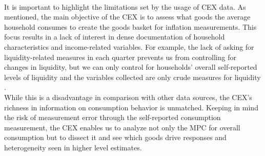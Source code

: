 \\ It is important to highlight the limitations set by the usage of CEX data. As mentioned, the main objective of the CEX is to assess what goods the average household consumes to create the goods basket for inflation measurements. This focus results in a lack of interest in dense documentation of household characteristics and income-related variables. For example, the lack of asking for liquidity-related measures in each quarter prevents us from controlling for changes in liquidity, but we can only control for households' overall self-reported levels of liquidity and the variables collected are only crude measures for liquidity \citep{parkeretal_2013}. \\
While this is a disadvantage in comparison with other data sources, the CEX's richness in information on consumption behavior is unmatched. Keeping in mind the risk of measurement error through the self-reported consumption measurement, the CEX enables us to analyze not only the MPC for overall consumption but to dissect it and see which goods drive responses and heterogeneity seen in higher level estimates.